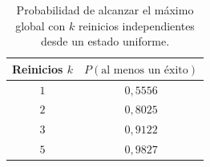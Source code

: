 \begin{table}[H]
\centering
\small
\setlength{\tabcolsep}{6pt}
\renewcommand{\arraystretch}{1.15}
\begin{tabular}{|c|c|}
\hline
\rowcolor{encabezado}\textbf{Reinicios $k$} & \textbf{$P(\text{al menos un éxito})$} \\
\hline
$1$ & $0{,}5556$ \\
\hline
$2$ & $0{,}8025$ \\
\hline
$3$ & $0{,}9122$ \\
\hline
$5$ & $0{,}9827$ \\
\hline
\end{tabular}
\caption{Probabilidad de alcanzar el máximo global con $k$ reinicios independientes desde un estado uniforme.}
\label{tab:p2b-reinicios}
\end{table}

